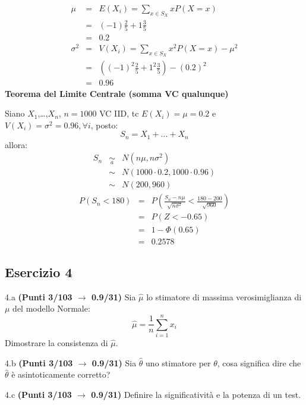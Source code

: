 \documentclass[
  11pt,
]{book}
\theoremstyle{mytheoremstyle}
\theoremstyle{mydefstyle}
\newenvironment{sol}
  {
  \begin{tcolorbox}[enhanced,breakable,arc=0.1mm,boxrule=1pt,colback=white,colframe=iblue,
  title=\bf \fontfamily{lmss}\selectfont \hspace{.5 cm} Soluzione,drop fuzzy shadow]

}{
\end{tcolorbox}
  }
\begin{document}
\begin{sol}
\begin{eqnarray*} \mu &=& E(X_i) = \sum_{x\in S_X}x P(X=x)\\ 
 &=& ( -1 ) \frac { 2 }{ 5 }+ 1  \frac { 3 }{ 5 } \\ 
            &=& 0.2 \\ 
 \sigma^2 &=& V(X_i) = \sum_{x\in S_X}x^2 P(X=x)-\mu^2\\ 
 &=&\left( ( -1 ) ^2\frac { 2 }{ 5 }+ 1  ^2\frac { 3 }{ 5 } \right)-( 0.2 )^2\\ 
            &=& 0.96 
\end{eqnarray*}
\textbf{Teorema del Limite Centrale (somma VC qualunque)}

Siano \(X_1\),\ldots,\(X_n\), \(n=1000\) VC IID, tc \(E(X_i)=\mu=0.2\) e \(V(X_i)=\sigma^2=0.96,\forall i\), posto:
\[
      S_n = X_1 + ... + X_n
      \]
allora:\begin{eqnarray*}
  S_n & \mathop{\sim}\limits_{a}& N(n\mu,n\sigma^2) \\
     &\sim & N(1000\cdot0.2,1000\cdot0.96) \\
     &\sim & N(200,960) 
  \end{eqnarray*}\begin{eqnarray*}
      P( S_n   <   180 ) 
        &=& P\left(  \frac { S_n  -  n\mu }{ \sqrt{n\sigma^2} }  <  \frac { 180  -  200 }{\sqrt{ 960 }} \right)  \\
                 &=& P\left(  Z   <   -0.65 \right) \\    
                 &=&  1-\Phi( 0.65 ) \\ &=&  0.2578 
      \end{eqnarray*}

\end{sol}

\subsection{Esercizio 4}\label{esercizio-4-49}

4.a \textbf{(Punti 3/103 \(\rightarrow\) 0.9/31)} Sia \(\hat \mu\) lo stimatore di massima verosimiglianza di \(\mu\) del modello Normale:
\[\hat\mu =  \frac 1n\sum_{i=1}^n x_i\]
Dimostrare la consistenza di \(\hat \mu\).

4.b \textbf{(Punti 3/103 \(\rightarrow\) 0.9/31)} Sia \(\hat\theta\) uno stimatore per \(\theta\), cosa significa dire che \(\hat\theta\) è asintoticamente corretto?

4.c \textbf{(Punti 3/103 \(\rightarrow\) 0.9/31)} Definire la significatività e la potenza di un test.
\end{document}
